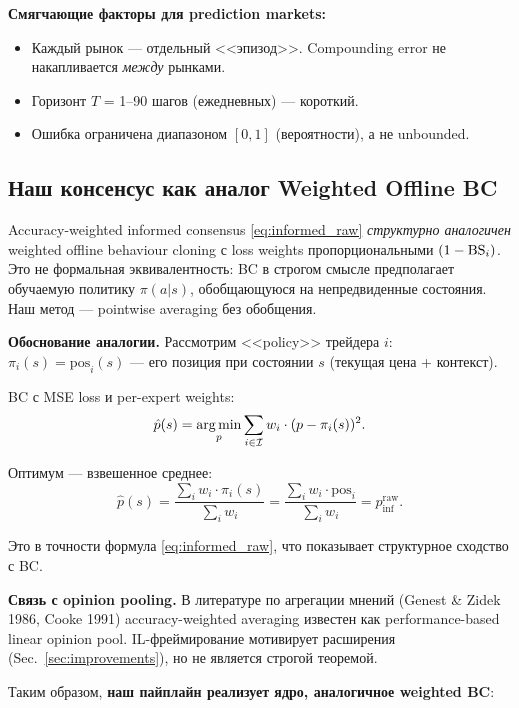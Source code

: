 \textbf{Смягчающие факторы для prediction markets:}
\begin{itemize}[nosep]
  \item Каждый рынок --- отдельный <<эпизод>>. Compounding error не накапливается \emph{между} рынками.
  \item Горизонт $T$ = 1--90 шагов (ежедневных) --- короткий.
  \item Ошибка ограничена диапазоном $[0, 1]$ (вероятности), а не unbounded.
\end{itemize}

\subsection{Наш консенсус как аналог Weighted Offline BC}

\begin{remark}
Accuracy-weighted informed consensus \eqref{eq:informed_raw} \emph{структурно аналогичен}
weighted offline behaviour cloning с loss weights пропорциональными $(1 - \mathrm{BS}_i)$.
Это не формальная эквивалентность: BC в строгом смысле предполагает
обучаемую политику $\pi(a|s)$, обобщающуюся на непредвиденные состояния.
Наш метод --- pointwise averaging без обобщения.
\end{remark}

\textbf{Обоснование аналогии.}
Рассмотрим <<policy>> трейдера $i$: $\pi_i(s) = \mathrm{pos}_i(s)$
--- его позиция при состоянии $s$ (текущая цена + контекст).

BC с MSE loss и per-expert weights:
\[
\hat{p}(s) = \operatorname*{arg\,min}_{p} \sum_{i \in \mathcal{I}} w_i \cdot (p - \pi_i(s))^2.
\]

Оптимум --- взвешенное среднее:
\[
\hat{p}(s) = \frac{\sum_{i} w_i \cdot \pi_i(s)}{\sum_{i} w_i}
= \frac{\sum_{i} w_i \cdot \mathrm{pos}_i}{\sum_{i} w_i}
= p_{\mathrm{inf}}^{\mathrm{raw}}.
\]

Это в точности формула \eqref{eq:informed_raw}, что показывает структурное
сходство с BC.

\textbf{Связь с opinion pooling.}
В литературе по агрегации мнений (Genest \& Zidek 1986, Cooke 1991)
accuracy-weighted averaging известен как performance-based linear opinion pool.
IL-фреймирование мотивирует расширения (Sec.~\ref{sec:improvements}),
но не является строгой теоремой.

Таким образом, \textbf{наш пайплайн реализует ядро, аналогичное weighted BC}:

